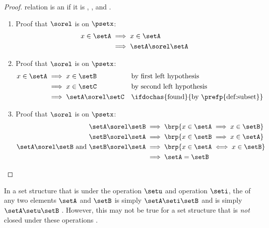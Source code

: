 \begin{proof}
relation is an  if it is
, , and .

\begin{enumerate}
  \item Proof that $\sorel$ is  on $\psetx$:
    \begin{align*}
      x\in\setA
        &\implies x\in\setA
      \\&\implies \setA\sorel\setA
    \end{align*}

  \item Proof that $\sorel$ is  on $\psetx$:
    \begin{align*}
      x\in\setA
        &\implies x\in\setB
        &&        \text{by first left hypothesis}
      \\&\implies x\in\setC
        &&        \text{by second left hypothesis}
      \\&\implies \setA\sorel\setC
        &&        \text{\ifdochas{found}{by \prefp{def:subset}}}
    \end{align*}

  \item Proof that $\sorel$ is  on $\psetx$:
    \begin{align*}
      \setA\sorel\setB
        &\implies \brp{x\in\setA\implies x\in\setB}
        \\
      \setB\sorel\setA
        &\implies \brp{x\in\setB\implies x\in\setA}
        \\
      \setA\sorel\setB \text{ and } \setB\sorel\setA
        &\implies \brp{x\in\setA\iff x\in\setB}
      \\&\implies \setA=\setB
    \end{align*}
\end{enumerate}
\end{proof}

In a set structure that is  under the  operation $\setu$ and 
 operation $\seti$, 
the  of any two elements $\setA$ and $\setB$ is simply $\setA\seti\setB$
and  is simply $\setA\setu\setB$ .
However, this may not be true for a set structure that is \emph{not} closed under these operations .


